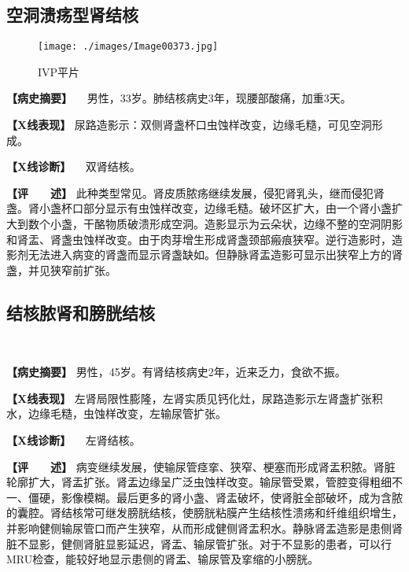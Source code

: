 \subsection{空洞溃疡型肾结核}

\begin{figure}[!htbp]
    \centering
    \texttt{[image: ./images/Image00373.jpg]}
    \captionsetup{justification=centering}
    \caption{IVP平片}
    \label{fig6-4-2}
\end{figure}

\textbf{【病史摘要】} 　男性，33岁。肺结核病史3年，现腰部酸痛，加重3天。

\textbf{【X线表现】}
尿路造影示：双侧肾盏杯口虫蚀样改变，边缘毛糙，可见空洞形成。

\textbf{【X线诊断】} 　双肾结核。

\textbf{【评　　述】}
此种类型常见。肾皮质脓疡继续发展，侵犯肾乳头，继而侵犯肾盏。肾小盏杯口部分显示有虫蚀样改变，边缘毛糙。破坏区扩大，由一个肾小盏扩大到数个小盏，干酪物质破溃形成空洞。造影显示为云朵状，边缘不整的空洞阴影和肾盂、肾盏虫蚀样改变。由于肉芽增生形成肾盏颈部瘢痕狭窄。逆行造影时，造影剂无法进入病变的肾盏而显示肾盏缺如。但静脉肾盂造影可显示出狭窄上方的肾盏，并见狭窄前扩张。

\subsection{结核脓肾和膀胱结核}

\begin{figure}
    \centering
    \\
    \caption{}
    \label{fig6-4-3}
\end{figure}

\textbf{【病史摘要】}
男性，45岁。有肾结核病史2年，近来乏力，食欲不振。

\textbf{【X线表现】}
左肾局限性膨隆，左肾实质见钙化灶，尿路造影示左肾盏扩张积水，边缘毛糙，虫蚀样改变，左输尿管扩张。

\textbf{【X线诊断】} 　左肾结核。

\textbf{【评　　述】}
病变继续发展，使输尿管痉挛、狭窄、梗塞而形成肾盂积脓。肾脏轮廓扩大，肾盂扩张。肾盂边缘呈广泛虫蚀样改变。输尿管受累，管腔变得粗细不一、僵硬，影像模糊。最后更多的肾小盏、肾盂破坏，使肾脏全部破坏，成为含脓的囊腔。肾结核常可继发膀胱结核，使膀胱粘膜产生结核性溃疡和纤维组织增生，并影响健侧输尿管口而产生狭窄，从而形成健侧肾盂积水。静脉肾盂造影是患侧肾脏不显影，健侧肾脏显影延迟，肾盂、输尿管扩张。对于不显影的患者，可以行MRU检查，能较好地显示患侧的肾盂、输尿管及挛缩的小膀胱。

